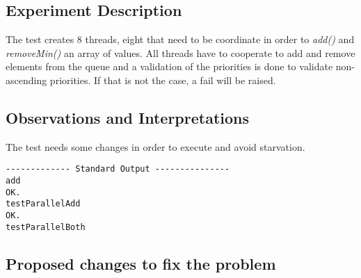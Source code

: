 
\subsection{Experiment Description} 
\par
The test creates $8$ threads, eight that need to be coordinate in order to \textit{add()} and \textit{removeMin()} an array of values. All threads have to cooperate to add and remove elements from the queue and a validation of the priorities is done to validate non-ascending priorities.
If that is not the case, a fail will be raised.
\par



\subsection{Observations and Interpretations}

\par
The test needs some changes in order to execute and avoid starvation.
\begin{lstlisting}[frame=single,breaklines=true]
------------- Standard Output ---------------
add
OK.
testParallelAdd
OK.
testParallelBoth

\end{lstlisting}



\subsection{Proposed changes to fix the problem}


